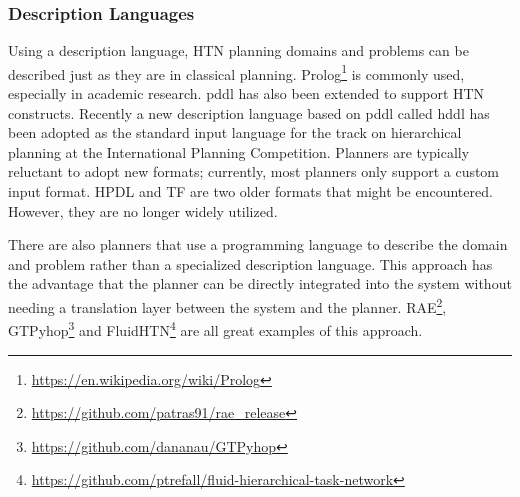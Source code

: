 \subsubsection{Description Languages}
Using a description language, HTN planning domains and problems can be described just as they are in classical planning. Prolog\footnote{\url{https://en.wikipedia.org/wiki/Prolog}} is commonly used, especially in academic research. \gls{pddl} has also been extended to support HTN constructs. Recently a new description language based on \gls{pddl} called \gls{hddl} has been adopted as the standard input language for the track on hierarchical planning at the International Planning Competition. Planners are typically reluctant to adopt new formats; currently, most planners only support a custom input format. HPDL and TF are two older formats that might be encountered. However, they are no longer widely utilized.


\begin{table}[H]
    \centering
    \caption{The stack task from the block-world domain in different formats.}
    \label{tab:my-table}
\end{table}



There are also planners that use a programming language to describe the domain and problem rather than a specialized description language. This approach has the advantage that the planner can be directly integrated into the system without needing a translation layer between the system and the planner. RAE\footnote{\url{https://github.com/patras91/rae_release}}, GTPyhop\footnote{\url{https://github.com/dananau/GTPyhop}} and FluidHTN\footnote{\url{https://github.com/ptrefall/fluid-hierarchical-task-network}} are all great examples of this approach.

